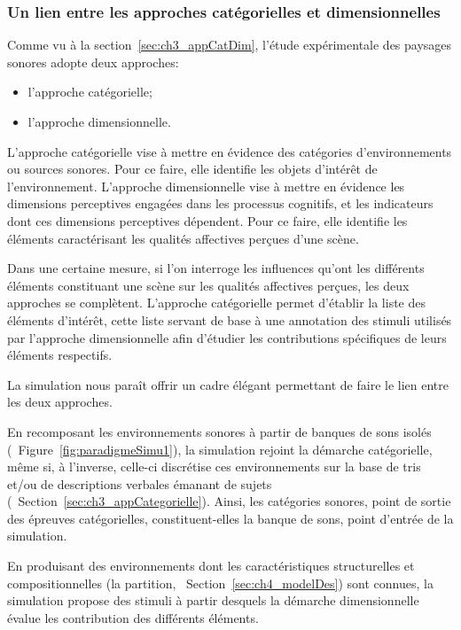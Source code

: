 \subsubsection{Un lien entre les approches catégorielles et dimensionnelles}

Comme vu à la section~\ref{sec:ch3_appCatDim}, l'étude expérimentale des paysages sonores adopte deux approches:

\begin{itemize}
\item l'approche catégorielle;
\item l'approche dimensionnelle.
\end{itemize}

L'approche catégorielle vise à mettre en évidence des catégories d'environnements ou sources sonores. Pour ce faire, elle identifie les objets d'intérêt de l'environnement. L'approche dimensionnelle vise à mettre en évidence les dimensions perceptives engagées dans les processus cognitifs, et les indicateurs dont ces dimensions perceptives dépendent. Pour ce faire, elle identifie les éléments caractérisant les qualités affectives perçues d'une scène.

Dans une certaine mesure, si l'on interroge les influences qu'ont les différents éléments constituant une scène sur les qualités affectives perçues, les deux approches se complètent. L'approche catégorielle permet d'établir la liste des éléments d'intérêt, cette liste servant de base à une annotation des stimuli utilisés par l'approche dimensionnelle afin d'étudier les contributions spécifiques de leurs éléments respectifs.

La simulation nous paraît offrir un cadre élégant permettant de faire le lien entre les deux approches.

En recomposant les environnements sonores à partir de banques de sons isolés (\cf~Figure~\ref{fig:paradigmeSimu1}), la simulation rejoint la démarche catégorielle, même si, à l'inverse, celle-ci discrétise ces environnements sur la base de tris et/ou de descriptions verbales émanant de sujets (\cf~Section~\ref{sec:ch3_appCategorielle}). Ainsi, les catégories sonores, point de sortie des épreuves catégorielles, constituent-elles la banque de sons, point d'entrée de la simulation.

En produisant des environnements dont les caractéristiques structurelles et compositionnelles (la partition, \cf~Section~\ref{sec:ch4_modelDes}) sont connues, la simulation propose des stimuli à partir desquels la démarche dimensionnelle évalue les contribution des différents éléments.


